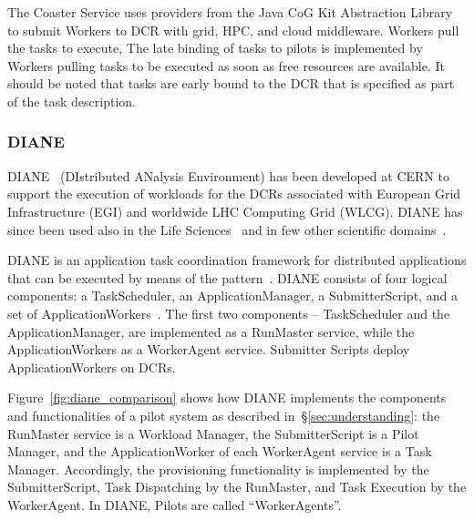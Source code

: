 \documentclass{sig-alternate}
\begin{document}
The Coaster Service uses providers from the Java CoG Kit Abstraction Library to
submit Workers to DCR with grid, HPC, and cloud middleware. Workers pull the
tasks to execute, The late binding of tasks to pilots is implemented by Workers
pulling tasks to be executed as soon as free resources are available. It should
be noted that tasks are early bound to the DCR that is specified as part of the
task description.

%
\subsubsection{DIANE}\label{sec:diane}

DIANE~\cite{moscicki2003diane} (DIstributed ANalysis Environment) has been
developed at CERN to support the execution of workloads for the DCRs associated
with European Grid Infrastructure (EGI) and worldwide LHC Computing Grid (WLCG).
DIANE has since been used also in the Life
Sciences~\cite{moscicki2004biomedical,jacq2007virtual,moscicki2003} and in few
other scientific domains~\cite{bacu2011gswat,mantero2003simulation}.

DIANE is an application task coordination framework for distributed applications
that can be executed by means of the \MW pattern~\cite{moscicki2003diane}. DIANE
consists of four logical components: a TaskScheduler, an ApplicationManager, a
SubmitterScript, and a set of ApplicationWorkers~\cite{diane_url}. The first two
components -- TaskScheduler and the ApplicationManager, are implemented as a
RunMaster service, while the ApplicationWorkers as a WorkerAgent service.
Submitter Scripts deploy ApplicationWorkers on DCRs.


Figure~\ref{fig:diane_comparison} shows how DIANE implements the components and
functionalities of a pilot system as described in~\S\ref{sec:understanding}: the
RunMaster service is a Workload Manager, the SubmitterScript is a Pilot Manager,
and the ApplicationWorker of each WorkerAgent service is a Task Manager.
Accordingly, the \pilot provisioning functionality is implemented by the
SubmitterScript, Task Dispatching by the RunMaster, and Task Execution by the
WorkerAgent. In DIANE, Pilots are called ``WorkerAgents''.
\end{document}
